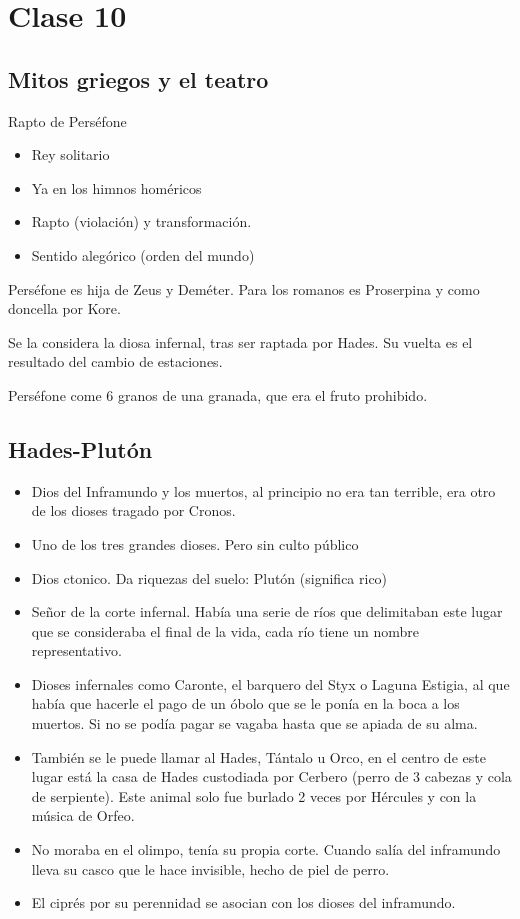 \chapter{Clase 10}\label{ch:clase10}
\section{Mitos griegos y el teatro}
Rapto de Perséfone
\begin{itemize}
    \item Rey solitario
    \item Ya en los himnos homéricos
    \item Rapto (violación) y transformación.
    \item Sentido alegórico (orden del mundo)
\end{itemize}

Perséfone es hija de Zeus y Deméter. Para los romanos es Proserpina y como doncella por Kore.

Se la considera la diosa infernal, tras ser raptada por Hades. Su vuelta es el resultado del cambio de estaciones.

Perséfone come 6 granos de una granada, que era el fruto prohibido.

\section{Hades-Plutón}
\begin{itemize}
    \item Dios del Inframundo y los muertos, al principio no era tan terrible, era otro de los dioses tragado por Cronos.
    \item Uno de los tres grandes dioses. Pero sin culto público
    \item Dios ctonico. Da riquezas del suelo: Plutón (significa rico)
    \item Señor de la corte infernal. Había una serie de ríos que delimitaban este lugar que se consideraba el final de la vida, cada río tiene un nombre representativo.
    \item Dioses infernales como Caronte, el barquero del Styx o Laguna Estigia, al que había que hacerle el pago de un óbolo que se le ponía en la boca a los muertos. Si no se podía pagar se vagaba hasta que se apiada de su alma.
    \item También se le puede llamar al Hades, Tántalo u Orco, en el centro de este lugar está la casa de Hades custodiada por Cerbero (perro de 3 cabezas y cola de serpiente). Este animal solo fue burlado 2 veces por Hércules y con la música de Orfeo.
    \item No moraba en el olimpo, tenía su propia corte. Cuando salía del inframundo lleva su casco que le hace invisible, hecho de piel de perro.
    \item El ciprés por su perennidad se asocian con los dioses del inframundo.
\end{itemize}

